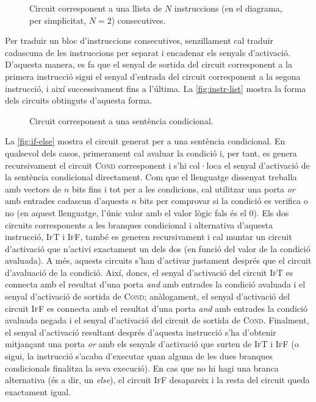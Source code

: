 \begin{figure}[ht]
    \centering
    
    \caption{Circuit corresponent a una llista de \(N\) instruccions (en el 
        diagrama, per simplicitat, \(N=2\)) consecutives.}
    \label{fig:instr-list}
\end{figure}

Per traduir un bloc d'instruccions consecutives, senzillament cal traduir 
cadascuna de les instruccions per separat i encadenar els senyals d'activació. 
D'aquesta manera, es fa que el senyal de sortida del circuit corresponent a la 
primera instrucció sigui el senyal d'entrada del circuit corresponent a la 
segona instrucció, i així successivament fins a l'última. La 
\autoref{fig:instr-list} mostra la forma dels circuits obtinguts d'aquesta 
forma.

\begin{figure}[ht]
    \centering
    
    \caption{Circuit corresponent a una sentència condicional.}
    \label{fig:if-else}
\end{figure}

La \autoref{fig:if-else} mostra el circuit generat per a una sentència 
condicional. En qualsevol dels casos, primerament cal avaluar la condició i, 
per tant, es genera recursivament el circuit \textsc{Cond} corresponent i s'hi 
col·loca el senyal d'activació de la sentència condicional directament. Com 
que el llenguatge dissenyat treballa amb vectors de \(n\) bits fins i tot per 
a les condicions, cal utilitzar una porta \textit{or} amb entrades cadascun 
d'aquests \(n\) bits per comprovar si la condició es verifica o no (en aquest 
llenguatge, l'únic valor amb el valor lògic fals és el 0). Els dos circuits 
corresponents a les branques condicional i alternativa d'aquesta instrucció, 
\textsc{IfT} i \textsc{IfF}, també es generen recursivament i cal muntar 
un circuit d'activació que n'activi exactament un dels dos (en funció del 
valor de la condició avaluada). A més, aquests circuits s'han d'activar 
justament després que el circuit d'avaluació de la condició. Així, doncs, el 
senyal d'activació del circuit \textsc{IfT} es connecta amb el resultat d'una 
porta \textit{and} amb entrades la condició avaluada i el senyal d'activació 
de sortida de \textsc{Cond}; anàlogament, el senyal d'activació del circuit 
\textsc{IfF} es connecta amb el resultat d'una porta \textit{and} amb entrades 
la condició avaluada negada i el senyal d'activació del circuit de sortida de 
\textsc{Cond}. Finalment, el senyal d'activació resultant després d'aquesta 
instrucció s'ha d'obtenir mitjançant una porta \textit{or} amb els senyals 
d'activació que surten de \textsc{IfT} i \textsc{IfF} (o sigui, la instrucció 
s'acaba d'executar quan alguna de les dues branques condicionals finalitza la 
seva execució). En cas que no hi hagi una branca alternativa (és a dir, un 
\textit{else}), el circuit \textsc{IfF} desapareix i la resta del circuit 
queda exactament igual.

